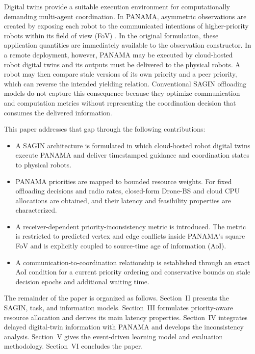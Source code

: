 \IfFileExists{IEEEtran.cls}{\documentclass[conference]{IEEEtran}}{\documentclass[10pt,twocolumn]{article}}
\begin{document}
Digital twins provide a suitable execution environment for computationally demanding multi-agent coordination. In PANAMA, asymmetric observations are created by exposing each robot to the communicated intentions of higher-priority robots within its field of view (FoV) \cite{dogru2025panama}. In the original formulation, these application quantities are immediately available to the observation constructor. In a remote deployment, however, PANAMA may be executed by cloud-hosted robot digital twins and its outputs must be delivered to the physical robots. A robot may then compare stale versions of its own priority and a peer priority, which can reverse the intended yielding relation. Conventional SAGIN offloading models do not capture this consequence because they optimize communication and computation metrics without representing the coordination decision that consumes the delivered information.

This paper addresses that gap through the following contributions:
\begin{itemize}
    \item A SAGIN architecture is formulated in which cloud-hosted robot digital twins execute PANAMA and deliver timestamped guidance and coordination states to physical robots.
    \item PANAMA priorities are mapped to bounded resource weights. For fixed offloading decisions and radio rates, closed-form Drone-BS and cloud CPU allocations are obtained, and their latency and feasibility properties are characterized.
    \item A receiver-dependent priority-inconsistency metric is introduced. The metric is restricted to predicted vertex and edge conflicts inside PANAMA's square FoV and is explicitly coupled to source-time age of information (AoI).
    \item A communication-to-coordination relationship is established through an exact AoI condition for a current priority ordering and conservative bounds on stale decision epochs and additional waiting time.
\end{itemize}

The remainder of the paper is organized as follows. Section~II presents the SAGIN, task, and information models. Section~III formulates priority-aware resource allocation and derives its main latency properties. Section~IV integrates delayed digital-twin information with PANAMA and develops the inconsistency analysis. Section~V gives the event-driven learning model and evaluation methodology. Section~VI concludes the paper.
\end{document}
